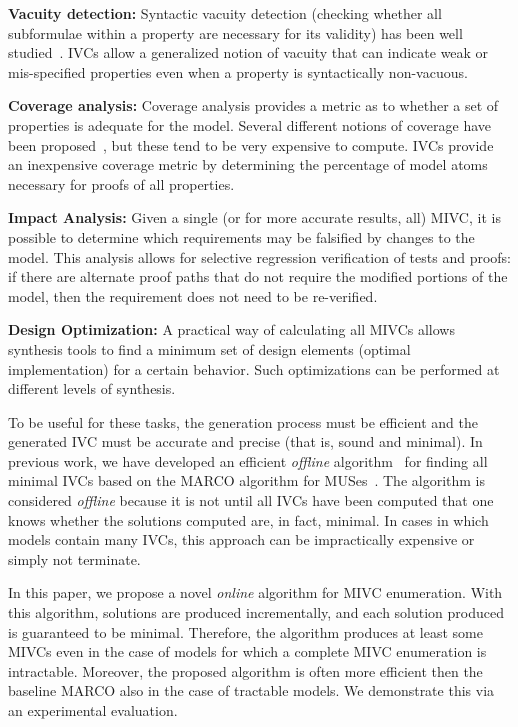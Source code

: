 \noindent \textbf{Vacuity detection:} Syntactic vacuity detection (checking whether all subformulae within a property are necessary for its validity) has been well studied~\cite{Kupferman03:Vacuity}.   IVCs allow a generalized notion of vacuity that can indicate weak or mis-specified properties even when a property is syntactically non-vacuous.

\noindent \textbf{Coverage analysis:} Coverage analysis provides a metric as to whether a set of properties is adequate for the model.  Several different notions of coverage have been proposed~\cite{chockler_coverage_2003,kupferman_theory_2008}, but these tend to be very expensive to compute.  IVCs provide an inexpensive coverage metric by determining the percentage of model atoms necessary for proofs of all properties.

\noindent \textbf{Impact Analysis:} Given a single (or for more accurate results, all) MIVC, it is possible to determine which requirements may be falsified by changes to the model.  This analysis allows for selective regression verification of tests and proofs: if there are alternate proof paths that do not require the modified portions of the model, then the requirement does not need to be re-verified.

\noindent \textbf{Design Optimization:} A practical way of calculating all MIVCs allows synthesis tools to find a minimum set of design elements (optimal implementation) for a certain behavior. Such optimizations can be performed at different levels of synthesis.

To be useful for these tasks, the generation process must be efficient and the generated IVC must be accurate and precise (that is, sound and minimal).  In previous work, we have developed an efficient {\em offline} algorithm~\cite{Ghass17AllIVCs} for finding all minimal IVCs based on the MARCO algorithm for MUSes~\cite{marco2016fast}.  The algorithm is considered {\em offline} because it is not until all IVCs have been computed that one knows whether the solutions computed are, in fact, minimal.  In cases in which models contain many IVCs, this approach can be impractically expensive or simply not terminate.

In this paper, we propose a novel {\em online} algorithm for MIVC enumeration.  With this algorithm, solutions are produced incrementally, and each solution produced is guaranteed to be minimal.
Therefore, the algorithm produces at least some MIVCs even in the case of models for which a complete MIVC enumeration is intractable. Moreover, the proposed algorithm is often more efficient then the baseline MARCO also in the case of tractable models.
We demonstrate this via an experimental evaluation.


